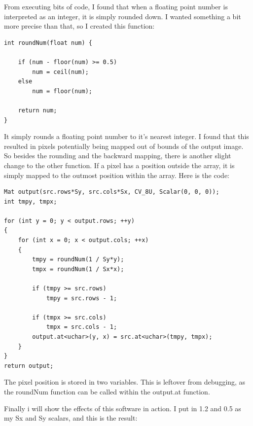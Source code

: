 \documentclass[11pt,oneside,a4paper,openright]{report}
\begin{document}
From executing bits of code, I found that when a floating point number is interpreted as an integer, it is simply rounded down. I wanted something a bit more precise than that, so I created this function:
\begin{lstlisting}
int roundNum(float num) {

	if (num - floor(num) >= 0.5)
		num = ceil(num);
	else
		num = floor(num);

	return num;
}
\end{lstlisting}
It simply rounds a floating point number to it's nearest integer. I found that this resulted in pixels potentially being mapped out of bounds of the output image. So besides the rounding and the backward mapping, there is another slight change to the other function. If a pixel has a position outside the array, it is simply mapped to the outmost position within the array. Here is the code:
\begin{lstlisting}
Mat output(src.rows*Sy, src.cols*Sx, CV_8U, Scalar(0, 0, 0));
int tmpy, tmpx;

for (int y = 0; y < output.rows; ++y)
{
	for (int x = 0; x < output.cols; ++x)
	{
		tmpy = roundNum(1 / Sy*y);
		tmpx = roundNum(1 / Sx*x);
		
		if (tmpy >= src.rows)
			tmpy = src.rows - 1;

		if (tmpx >= src.cols)
			tmpx = src.cols - 1;
		output.at<uchar>(y, x) = src.at<uchar>(tmpy, tmpx);
	}
}
return output;
\end{lstlisting}
The pixel position is stored in two variables. This is leftover from debugging, as the roundNum function can be called within the output.at function. 

Finally i will show the effects of this software in action. I put in 1.2 and 0.5 as my Sx and Sy scalars, and this is the result:
\end{document}
